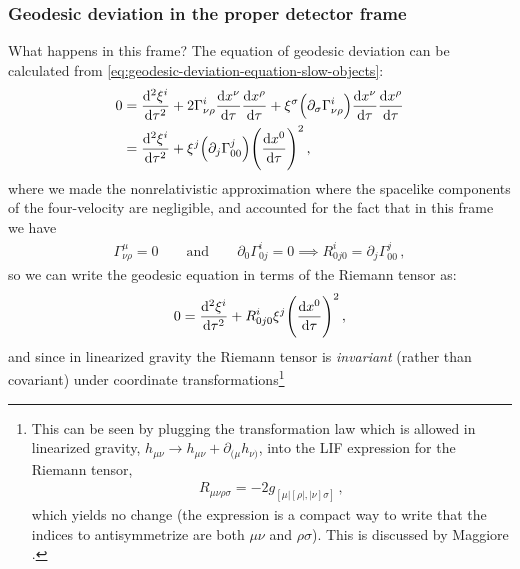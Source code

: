 \documentclass[main.tex]{subfiles}
\begin{document}
\subsubsection{Geodesic deviation in the proper detector frame}



What happens in this frame? The equation of geodesic deviation can be calculated from \eqref{eq:geodesic-deviation-equation-slow-objects}:
%
\begin{subequations}
\begin{align}
0 &= \dv[2]{\xi^{i}}{\tau}
+ 2 \Gamma^{i}_{\nu \rho } \dv{x^{\nu }}{\tau } \dv{x^{\rho }}{\tau }
+ \xi^{\sigma } \qty( \partial_{\sigma } \Gamma^{i}_{\nu \rho } ) \dv{x^{\nu }}{\tau } \dv{x^{\rho }}{\tau }  \\
&=\dv[2]{\xi^{i}}{\tau}
+ \xi^{j} \qty(\partial_{j} \Gamma^{j}_{00}) \qty(\dv{x^{0}}{\tau })^2
\,,
\end{align}
\end{subequations}
%
where we made the nonrelativistic approximation where the spacelike components of the four-velocity are negligible, and accounted for the fact that in this frame we have  
%
\begin{align}
\Gamma^{\mu }_{\nu \rho } = 0
\qquad \text{and} \qquad
\partial_0 \Gamma^{i}_{0j} =0 
\implies 
R^{i}_{0j0} = \partial_{j} \Gamma^{j}_{00} 
\,,
\end{align}
%
so we can write the geodesic equation in terms of the Riemann tensor as:
%
\begin{align}
0= \dv[2]{\xi^{i}}{\tau } + R^{i}_{0j0} \xi^{j} \qty(\dv{x^{0}}{\tau })^2
\,,
\end{align}
%
and since in linearized gravity the Riemann tensor is \emph{invariant} (rather than covariant) under coordinate transformations\footnote{This can be seen by plugging the transformation law which is allowed in linearized gravity, \(h_{\mu \nu } \to h_{\mu \nu } + \partial_{(\mu } h_{\nu )}\), into the LIF expression for the Riemann tensor, 
%
\begin{align}
R_{\mu \nu \rho \sigma } = -2 g_{[\mu | [\rho | , |\nu ] \sigma] }
\,,
\end{align}
%
which yields no change (the expression is a compact way to write that the indices to antisymmetrize are both \(\mu \nu \) and \(\rho \sigma \)). This is discussed by Maggiore \cite[below eq.\ 1.13]{maggioreGravitationalWavesVolume2007}.}
\end{document}
